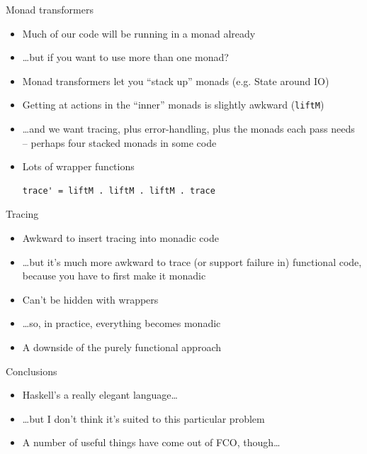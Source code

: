 \documentclass[adam,pdf,slideColor]{prosper}
\begin{document}
\begin{slide}{Monad transformers}
\begin{itemize}
\item Much of our code will be running in a monad already
\item \ldots but if you want to use more than one monad?
\item Monad transformers let you ``stack up'' monads (e.g. State
  around IO)
\item Getting at actions in the ``inner'' monads is slightly awkward
  (\verb|liftM|)
\item \ldots and we want tracing, plus error-handling, plus the monads
  each pass needs -- perhaps four stacked monads in some code
\item Lots of wrapper functions
\begin{verbatim}
trace' = liftM . liftM . liftM . trace
\end{verbatim}
\end{itemize}
\end{slide}

\begin{slide}{Tracing}
\begin{itemize}
\item Awkward to insert tracing into monadic code
\item \ldots but it's much more awkward to trace (or support failure
  in) functional code, because you have to first make it monadic
\item Can't be hidden with wrappers
\item \ldots so, in practice, everything becomes monadic
\item A downside of the purely functional approach
\end{itemize}
\end{slide}

\begin{slide}{Conclusions}
\begin{itemize}
\item Haskell's a really elegant language\ldots
\item \ldots but I don't think it's suited to this particular problem
\item A number of useful things have come out of FCO, though\ldots
\end{itemize}
\end{slide}
\end{document}
